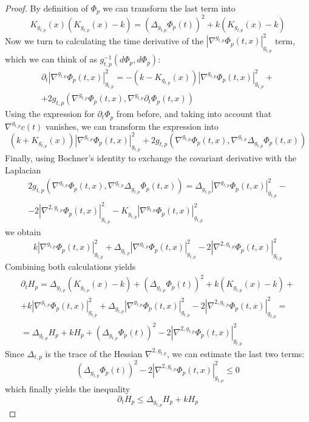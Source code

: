 \documentclass{article}
\theoremstyle{plain}
\theoremstyle{remark}
\theoremstyle{definition}
\begin{document}
\begin{proof}
    By definition of $\Phi_p$ we can transform the last term into 
    $$K_{g_{t,p}}(x)(K_{g_{t,p}}(x)-k) = (\Delta_{g_{t,p}} \Phi_p(t))^2+k(K_{g_{t,p}}(x)-k)$$
    Now we turn to calculating the time derivative of the $|\nabla^{g_{t,p}}\Phi_p(t,x)|_{g_{t,p}}^2$ term, which we can think of as $g^{-1}_{t,p}(d\Phi_p, d\Phi_p)$\thinspace:
    \begin{multline*}
        \partial_t |\nabla^{g_{t,p}}\Phi_p(t,x)|_{g_{t,p}}^2=-(k-K_{g_{t,p}}(x))|\nabla^{g_{t,p}}\Phi_p(t,x)|_{g_{t,p}}^2+ \\+2g_{t,p}(\nabla^{g_{t,p}}\Phi_p(t,x), \nabla^{g_{t,p}} \partial_t\Phi_p(t,x))
    \end{multline*}
    Using the expression for $\partial_t \Phi_p$ from before, and taking into account that $\nabla^{g_{t,p}} c(t)$ vanishes, we can transform the expression into
    $$(k+K_{g_{t,p}}(x))|\nabla^{g_{t,p}}\Phi_p(t,x)|_{g_{t,p}}^2 +2g_{t,p}(\nabla^{g_{t,p}}\Phi_p(t,x), \nabla^{g_{t,p}} \Delta_{g_{t,p}}\Phi_p(t,x))$$
    Finally, using Bochner's identity to exchange the covariant derivative with the Laplacian
    \begin{multline*}
        2g_{t,p}(\nabla^{g_{t,p}}\Phi_p(t,x), \nabla^{g_{t,p}} \Delta_{g_{t,p}}\Phi_p(t,x))=\Delta_{g_{t,p}}|\nabla^{g_{t,p}}\Phi_p(t,x)|_{g_{t,p}}^2-\\-2|\nabla^{2,g_{t,p}}\Phi_p(t,x)|_{g_{t,p}}^2 -K_{g_{t,p}}|\nabla^{g_{t,p}}\Phi_p(t,x)|_{g_{t,p}}^2
    \end{multline*}
    we obtain 
    $$k|\nabla^{g_{t,p}}\Phi_p(t,x)|_{g_{t,p}}^2+\Delta_{g_{t,p}}|\nabla^{g_{t,p}}\Phi_p(t,x)|_{g_{t,p}}^2-2|\nabla^{2,g_{t,p}}\Phi_p(t,x)|_{g_{t,p}}^2$$
    Combining both calculations yields 
    \begin{multline*}
        \partial_t H_p=\Delta_{g_{t,p}}(K_{g_{t,p}}(x)-k) + (\Delta_{g_{t,p}} \Phi_p(t))^2+k(K_{g_{t,p}}(x)-k) +\\+k|\nabla^{g_{t,p}}\Phi_p(t,x)|_{g_{t,p}}^2+\Delta_{g_{t,p}}|\nabla^{g_{t,p}}\Phi_p(t,x)|_{g_{t,p}}^2-2|\nabla^{2,g_{t,p}}\Phi_p(t,x)|_{g_{t,p}}^2 = \\= \Delta_{g_{t,p}}H_p+kH_p+(\Delta_{g_{t,p}} \Phi_p(t))^2-2|\nabla^{2,g_{t,p}}\Phi_p(t,x)|_{g_{t,p}}^2
    \end{multline*}
    Since $\Delta_{t,p}$ is the trace of the Hessian $\nabla^{2,g_{t,p}}$, we can estimate the last two terms\thinspace:
    $$(\Delta_{g_{t,p}} \Phi_p(t))^2-2|\nabla^{2,g_{t,p}}\Phi_p(t,x)|_{g_{t,p}}^2 \leq 0$$
    which finally yields the inequality
    $$\partial_t H_p \leq \Delta_{g_{t,p}}H_p+kH_p$$

\end{proof}
\end{document}
